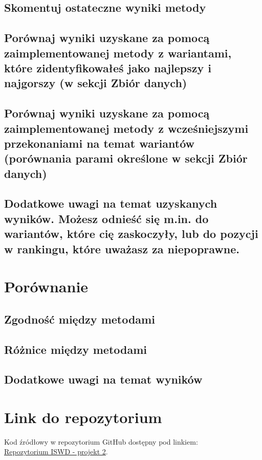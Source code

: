 \documentclass[11pt]{article}
\begin{document}
\subsection{Skomentuj ostateczne wyniki metody}

\subsection{Porównaj wyniki uzyskane za pomocą zaimplementowanej metody z wariantami, które zidentyfikowałeś jako najlepszy i najgorszy (w sekcji Zbiór danych)}

\subsection{Porównaj wyniki uzyskane za pomocą zaimplementowanej metody z wcześniejszymi przekonaniami na temat wariantów (porównania parami określone w sekcji Zbiór danych)}

\subsection{Dodatkowe uwagi na temat uzyskanych wyników. Możesz odnieść się m.in. do wariantów, które cię zaskoczyły, lub do pozycji w rankingu, które uważasz za niepoprawne.}

\section{Porównanie}
\subsection{Zgodność między metodami}

\subsection{Różnice między metodami}

\subsection{Dodatkowe uwagi na temat wyników}


\section{Link do repozytorium}\label{sec:link-do-repo}
Kod źródłowy w repozytorium GitHub dostępny pod linkiem: \\
\href{https://github.com/KotZPolibudy/PUT_ISWD/tree/main/projekt2}{Repozytorium ISWD - projekt 2}.
\end{document}
